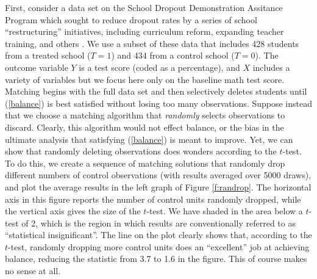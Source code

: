 \documentclass[11pt,titlepage]{article}
\begin{document}
First, consider a data set on the School Dropout Demonstration
Assitance Program which sought to reduce dropout rates by a series of
school ``restructuring'' initiatives, including curriculum reform,
expanding teacher training, and others \citep{AgoDyn04,Stuart04}.  We
use a subset of these data that includes 428 students from a treated
school ($T=1$) and 434 from a control school ($T=0$).  The outcome
variable $Y$ is a test score (coded as a percentage), and $X$ includes
a variety of variables but we focus here only on the baseline math
test score.  Matching begins with the full data set and then
selectively deletes students until (\ref{balance}) is best satisfied
without losing too many observations.  Suppose instead that we choose
a matching algorithm that \emph{randomly} selects observations to
discard.  Clearly, this algorithm would not effect balance, or the
bias in the ultimate analysis that satisfying (\ref{balance}) is meant
to improve.  Yet, we can show that randomly deleting observations does
wonders according to the $t$-test.  To do this, we create a sequence
of matching solutions that randomly drop different numbers of control
observations (with results averaged over 5000 draws), and plot the
average results in the left graph of Figure \ref{f:randrop}.  The
horizontal axis in this figure reports the number of control units
randomly dropped, while the vertical axis gives the size of the
$t$-test.  We have shaded in the area below a $t$-test of 2, which is
the region in which results are conventionally referred to as
``statistical insignificant''.  The line on the plot clearly shows
that, according to the $t$-test, randomly dropping more control units
does an ``excellent'' job at achieving balance, reducing the statistic
from 3.7 to 1.6 in the figure.  This of course makes no sense at all.
\end{document}
